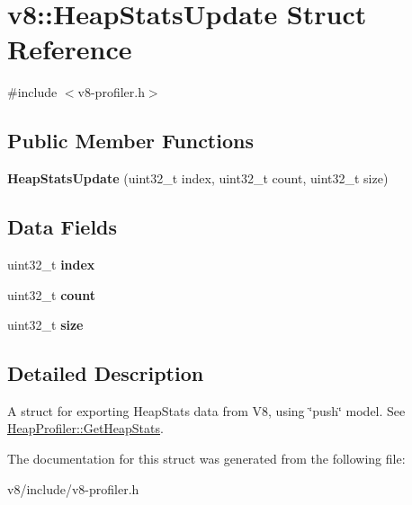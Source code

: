 \hypertarget{structv8_1_1HeapStatsUpdate}{}\section{v8\+:\+:Heap\+Stats\+Update Struct Reference}
\label{structv8_1_1HeapStatsUpdate}


{\ttfamily \#include $<$v8-\/profiler.\+h$>$}

\subsection*{Public Member Functions}
\begin{DoxyCompactItemize}
\item 
\mbox{\label{structv8_1_1HeapStatsUpdate_aba606181fa7071647cc91a558c450cf3}} 
{\bfseries Heap\+Stats\+Update} (uint32\+\_\+t index, uint32\+\_\+t count, uint32\+\_\+t size)
\end{DoxyCompactItemize}
\subsection*{Data Fields}
\begin{DoxyCompactItemize}
\item 
\mbox{\label{structv8_1_1HeapStatsUpdate_a90f427acc6e9b8cf2001ca09541545d7}} 
uint32\+\_\+t {\bfseries index}
\item 
\mbox{\label{structv8_1_1HeapStatsUpdate_aa74badb1bd196e538b45b971350c33de}} 
uint32\+\_\+t {\bfseries count}
\item 
\mbox{\label{structv8_1_1HeapStatsUpdate_a842a199bd372f411f0ae5816e38c45e2}} 
uint32\+\_\+t {\bfseries size}
\end{DoxyCompactItemize}


\subsection{Detailed Description}
A struct for exporting Heap\+Stats data from V8, using \char`\"{}push\char`\"{} model. See \mbox{\hyperlink{classv8_1_1HeapProfiler_add093717acd067daeddb7ef5fc8b191a}{Heap\+Profiler\+::\+Get\+Heap\+Stats}}. 

The documentation for this struct was generated from the following file\+:\begin{DoxyCompactItemize}
\item 
v8/include/v8-\/profiler.\+h\end{DoxyCompactItemize}
